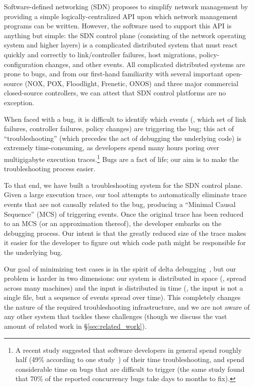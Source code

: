 Software-defined networking (SDN) proposes to simplify network management by
providing a simple logically-centralized API upon which network management
programs can be written.  However, the software used to support this API is
anything but simple: the SDN control plane (consisting of the network
operating system and higher layers) is a complicated distributed system that
must react quickly and correctly to link/controller failures, host migrations,
policy-configuration changes, and other events.
All complicated distributed systems are prone to bugs, and from our first-hand familiarity with several important open-source (NOX, POX, Floodlight, Frenetic, ONOS) and three major commercial closed-source controllers, we can attest that SDN control platforms are no exception.

When faced with a bug, it is difficult to identify which events (\ie, which
set of link failures, controller failures, policy changes) are triggering the
bug; this act of ``troubleshooting'' (which precedes the act of debugging the
underlying code) is extremely time-consuming, as developers spend many hours poring
over multigigabyte execution traces.\footnote{A recent study suggested that software developers in general spend roughly half (49\% according to one
study~\cite{msoft_concurrency}) of their time troubleshooting, and spend
considerable time on bugs that are difficult to trigger (the same study found
that 70\% of the reported concurrency bugs take days to months to fix).} Bugs
are a fact of life; our aim is to make the troubleshooting process easier.

To that end, we have built a troubleshooting system for the SDN control plane.
Given a large execution trace, our tool attempts to automatically eliminate
trace events that are not causally related to the bug, producing a ``Minimal
Causal Sequence'' (MCS) of triggering events. Once the original trace has
been reduced to an MCS (or an approximation thereof), the developer embarks
on the debugging process. Our intent is that the greatly reduced size of the trace makes it easier for the developer to figure out which code path might be responsible for the underlying bug.

Our goal of minimizing test cases is in the spirit of delta debugging~\cite{Zeller:1999:YMP:318773.318946}, but our
problem is harder in two dimensions: our system is distributed in space (\ie,
spread across many machines) and the input is distributed in time (\ie, the
input is not a single file, but a sequence of events spread over time). This
completely changes the nature of the required troubleshooting infrastructure,
and we are not aware of any other system that tackles these challenges (though
we discuss the vast amount of related work in \S\ref{sec:related_work}).

